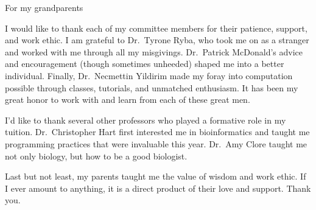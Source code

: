 
\begin{dedication}
For my grandparents
\end{dedication}

\begin{acknowledgements}
I would like to thank each of my committee members for their patience, support, and work ethic.  I am grateful to Dr.\ Tyrone Ryba, who
took me on as a stranger and worked with me through all my misgivings.  Dr.\ Patrick McDonald's advice and encouragement (though sometimes
unheeded) shaped me into a better individual.  Finally, Dr.\ Necmettin Yildirim made my foray into computation possible through classes,
tutorials, and unmatched enthusiasm.  It has been my great honor to work with and learn from each of these great men.

I'd like to thank several other professors who played a formative role in my tuition.  Dr.\ Christopher Hart first interested me in
bioinformatics and taught me programming practices that were invaluable this year.  Dr.\ Amy Clore taught me not only biology, but how
to be a good biologist.

Last but not least, my parents taught me the value of wisdom and work ethic.  If I ever amount to anything, it is a direct product of
their love and support.  Thank you.
\end{acknowledgements}
